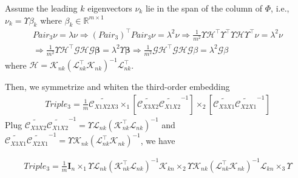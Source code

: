 \documentclass[11pt]{article}
\newcommand{\trans}{\top}
\newcommand{\bm}{\mathbf}
\begin{document}
Assume the leading $k$ eigenvectors $\nu_k$ lie in the span of the column of $\Phi$, i.e., $\nu_k = \Upsilon \beta_k$ where $\beta_k\in \mathbb{R}^{m\times 1}$
%
\begin{eqnarray*}
Pair_3\nu = \lambda \nu \Rightarrow (Pair_3)^\trans Pair_3\nu = \lambda^2 \nu \Rightarrow
\frac{1}{m^2} \Upsilon\mathcal{H}^\trans\Upsilon^\trans\Upsilon\mathcal{H}\Upsilon^\trans\nu
= \lambda^2\nu \\\Rightarrow
\frac{1}{m^2}\Upsilon\mathcal{H^\trans GHG}\bm{\beta} =
\lambda^2 \Upsilon\bm{\beta} \Rightarrow \frac{1}{m^2}\mathcal{GH^\trans GHG}\beta
= \lambda^2\mathcal{G}\beta
\end{eqnarray*}
%
where $\mathcal{H} = \mathcal{K}_{nk}(\mathcal{L}_{nk}^\trans\mathcal{K}_{nk})^{-1}\mathcal{L}_{nk}^\trans$.

Then, we symmetrize and whiten the third-order embedding
%
\begin{eqnarray}
Triple_3 = \frac{1}{m}\widetilde{\mathcal{C}_{X1X2X3}} \times_1
[\widetilde{\mathcal{C}_{X3X2}}\widetilde{\mathcal{C}_{X1X2}}^{-1}]
\times_2
[\widetilde{\mathcal{C}_{X3X1}}\widetilde{\mathcal{C}_{X2X1}}^{-1}]
\end{eqnarray}
%
Plug
$\widetilde{\mathcal{C}_{X3X2}}\widetilde{\mathcal{C}_{X1X2}}^{-1} =
\Upsilon\mathcal{L}_{nk}(\mathcal{K}_{nk}^\trans\mathcal{L}_{nk})^{-1}$
and
$\widetilde{\mathcal{C}_{X3X1}}\widetilde{\mathcal{C}_{X2X1}}^{-1} =
\Upsilon\mathcal{K}_{nk}(\mathcal{L}_{nk}^\trans\mathcal{K}_{nk})^{-1}$,
we have

\begin{eqnarray}
Triple_3  = \frac{1}{m}\bm{I}_n \times_1
\Upsilon\mathcal{L}_{nk}(\mathcal{K}_{nk}^\trans
\mathcal{L}_{nk})^{-1}\mathcal{K}_{kn} \times_2
\Upsilon\mathcal{K}_{nk}(\mathcal{L}_{nk}^\trans
\mathcal{K}_{nk})^{-1}\mathcal{L}_{kn} \times_3 \Upsilon
\end{eqnarray}
\end{document}
